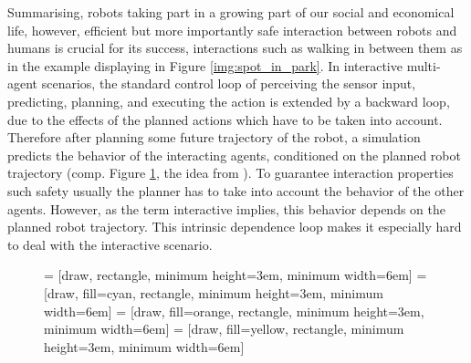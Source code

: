 Summarising, robots taking part in a growing part of our social and economical life, however, efficient but more importantly safe interaction between robots and humans is crucial for its success, interactions such as walking in between them as in the example displaying in Figure \ref{img:spot_in_park}.
\newline
In interactive multi-agent scenarios, the standard control loop of perceiving the sensor input, predicting, planning, and executing the action \cite{Siegwart2011} is extended by a backward loop, due to the effects of the planned actions which have to be taken into account. Therefore after planning some future trajectory of the robot, a simulation predicts the behavior of the interacting agents, conditioned on the planned robot trajectory (comp. Figure \ref{fig:control_loop_interactive}, the idea from \cite{Romanski2019}). To guarantee interaction properties such safety usually the planner has to take into account the behavior of the other agents. However, as the term interactive implies, this behavior depends on the planned robot trajectory. This intrinsic dependence loop makes it especially hard to deal with the interactive scenario. 

\begin{figure}
\begin{center}
 = [draw, rectangle, minimum height=3em, minimum width=6em]
 = [draw, fill=cyan, rectangle, minimum height=3em, minimum width=6em]
 = [draw, fill=orange, rectangle, minimum height=3em, minimum width=6em]
 = [draw, fill=yellow, rectangle, minimum height=3em, minimum width=6em]
\label{fig:control_loop_interactive}
\end{center}
\end{figure}

